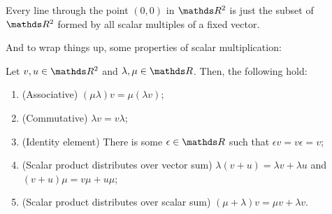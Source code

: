 \begin{cor}
	Every line through the point $(0,0)$ in $\R^2$ is just the subset of $\R^2$ formed by all scalar multiples of a fixed vector.
\end{cor}

And to wrap things up, some properties of scalar multiplication:

\begin{prop}
	Let $v,u\in \R^2$ and $\lambda,\mu\in \R$. Then, the following hold:
	\begin{enumerate}[(1)]
		\item (Associative) $(\mu\lambda)v=\mu(\lambda v)$;
		\item (Commutative) $\lambda v=v\lambda$;
		\item (Identity element) There is some $\epsilon\in \R$ such that $\epsilon v=v\epsilon=v$;
		\item (Scalar product distributes over vector sum) $\lambda(v+u)=\lambda v+\lambda u$ and $(v+u)\mu=v\mu+u\mu$;
		\item (Scalar product distributes over scalar sum) $(\mu+\lambda)v=\mu v+\lambda v$.
	\end{enumerate}
\end{prop}
